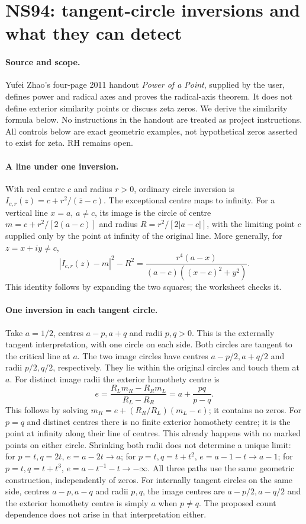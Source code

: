 \section*{NS94: tangent-circle inversions and what they can detect}
\paragraph{Source and scope.} Yufei Zhao's four-page 2011 handout
\emph{Power of a Point}, supplied by the user, defines power and radical
axes and proves the radical-axis theorem. It does not define exterior
similarity points or discuss zeta zeros. We derive the similarity formula
below. No instructions in the handout are treated as project instructions.
All controls below are exact geometric examples, not hypothetical zeros
asserted to exist for zeta. RH remains open.

\paragraph{A line under one inversion.}
With real centre $c$ and radius $r>0$, ordinary circle inversion is
$I_{c,r}(z)=c+r^2/(\bar z-c)$. The exceptional centre maps to infinity.
For a vertical line $x=a$, $a\ne c$, its image is the circle of centre
$m=c+r^2/[2(a-c)]$ and radius $R=r^2/[2|a-c|]$, with the limiting point
$c$ supplied only by the point at infinity of the original line.
More generally, for $z=x+iy\ne c$,
\[
 |I_{c,r}(z)-m|^2-R^2
 =\frac{r^4(a-x)}{(a-c)((x-c)^2+y^2)}.
\]
This identity follows by expanding the two squares; the worksheet checks it.

\paragraph{One inversion in each tangent circle.}
Take $a=1/2$, centres $a-p,a+q$ and radii $p,q>0$. This is the externally tangent interpretation, with one circle on each side. Both circles
are tangent to the critical line at $a$. The two image circles have centres
$a-p/2,a+q/2$ and radii $p/2,q/2$, respectively. They lie within the
original circles and touch them at $a$.
For distinct image radii the exterior homothety centre is
\[
 e=\frac{R_Lm_R-R_Rm_L}{R_L-R_R}=a+\frac{pq}{p-q}.
\]
This follows by solving $m_R=e+(R_R/R_L)(m_L-e)$; it contains no zeros.
For $p=q$ and distinct centres there is no finite exterior homothety centre;
it is the point at infinity along their line of centres. This already
happens with no marked points on either circle.
Shrinking both radii does not determine a unique limit: for $p=t,q=2t$,
$e=a-2t\to a$; for $p=t,q=t+t^2$, $e=a-1-t\to a-1$;
for $p=t,q=t+t^3$, $e=a-t^{-1}-t\to-\infty$.
All three paths use the same geometric construction, independently of zeros.
For internally tangent circles on the same side, centres $a-p,a-q$ and
radii $p,q$, the image centres are $a-p/2,a-q/2$ and the exterior
homothety centre is simply $a$ when $p\ne q$. The proposed count
dependence does not arise in that interpretation either.

